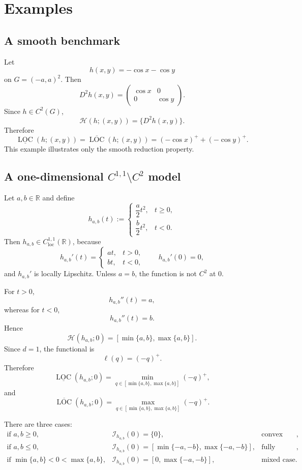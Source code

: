 \documentclass[11pt]{article}
\numberwithin{equation}{section}
\newcommand{\R}{\mathbb R}
\newcommand{\Hess}{\mathcal H}
\newcommand{\LOC}{\operatorname{LOC}}
\begin{document}
	\section{Examples}
	
	\subsection{A smooth benchmark}
	
	Let
	\[
	h(x,y)=-\cos x-\cos y
	\]
	on \(G=(-a,a)^2\). Then
	\[
	D^2h(x,y)
	=
	\begin{pmatrix}
		\cos x & 0\\
		0 & \cos y
	\end{pmatrix}.
	\]
	Since \(h\in C^2(G)\),
	\[
	\Hess(h;(x,y))=\{D^2h(x,y)\}.
	\]
	Therefore
	\[
	\underline{\LOC}(h;(x,y))
	=
	\overline{\LOC}(h;(x,y))
	=
	(-\cos x)^+ + (-\cos y)^+.
	\]
	This example illustrates only the smooth reduction property.
	
	\subsection{A one-dimensional \(C^{1,1}\setminus C^2\) model}
	
	Let \(a,b\in\R\) and define
	\[
	h_{a,b}(t)
	:=
	\begin{cases}
		\dfrac{a}{2}t^2, & t\geq0,\\[4pt]
		\dfrac{b}{2}t^2, & t<0.
	\end{cases}
	\]
	Then \(h_{a,b}\in C^{1,1}_{\mathrm{loc}}(\R)\), because
	\[
	h_{a,b}'(t)
	=
	\begin{cases}
		at, & t>0,\\
		bt, & t<0,
	\end{cases}
	\qquad
	h_{a,b}'(0)=0,
	\]
	and \(h_{a,b}'\) is locally Lipschitz. Unless \(a=b\), the function is not \(C^2\) at \(0\).
	
	For \(t>0\),
	\[
	h_{a,b}''(t)=a,
	\]
	whereas for \(t<0\),
	\[
	h_{a,b}''(t)=b.
	\]
	Hence
	\[
	\Hess(h_{a,b};0)
	=
	[\min\{a,b\},\max\{a,b\}].
	\]
	Since \(d=1\), the functional is
	\[
	\ell(q)=(-q)^+.
	\]
	Therefore
	\[
	\underline{\LOC}(h_{a,b};0)
	=
	\min_{q\in[\min\{a,b\},\max\{a,b\}]}(-q)^+,
	\]
	and
	\[
	\overline{\LOC}(h_{a,b};0)
	=
	\max_{q\in[\min\{a,b\},\max\{a,b\}]}(-q)^+.
	\]
	
	There are three cases:
	\[
	\begin{array}{lll}
		\text{if } a,b\geq0, & \mathcal I_{h_{a,b}}(0)=\{0\}, & \text{convex case},\\[3pt]
		\text{if } a,b\leq0, &
		\mathcal I_{h_{a,b}}(0)
		=
		[\min\{-a,-b\},\max\{-a,-b\}], &
		\text{fully nonconvex case},\\[3pt]
		\text{if } \min\{a,b\}<0<\max\{a,b\}, &
		\mathcal I_{h_{a,b}}(0)
		=
		[0,\max\{-a,-b\}], &
		\text{mixed case}.
	\end{array}
	\]
	
\end{document}
